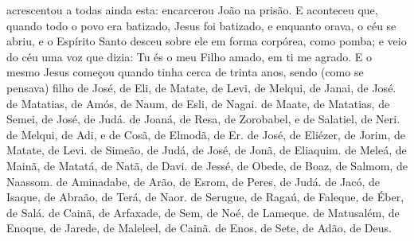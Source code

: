 {  acrescentou a todas ainda esta: encarcerou João na prisão.
  E aconteceu que, quando todo o povo era batizado, Jesus
{} foi batizado, e enquanto orava, o céu se abriu,
  e o Espírito Santo desceu sobre ele em forma corpórea, como pomba; e veio do céu uma voz que dizia: Tu és o meu Filho amado, em ti me agrado.
  E o mesmo Jesus começou quando tinha cerca de trinta anos, sendo (como se pensava) filho de José,
{} de Eli,
   de Matate,
{} de Levi,
{} de Melqui,
{} de Janai,
{} de José.
   de Matatias,
{} de Amós,
{} de Naum,
{} de Esli,
{} de Nagai.
   de Maate,
{} de Matatias,
{} de Semei,
{} de José,
{} de Judá.
   de Joaná,
{} de Resa,
{} de Zorobabel, e
{} de Salatiel,
{} de Neri.
   de Melqui,
{} de Adi, e
{} de Cosã,
{} de Elmodã,
{} de Er.
   de José,{} de Eliézer,
{} de Jorim,
{} de Matate,
{} de Levi.
   de Simeão,
{} de Judá,
{} de José,
{} de Jonã,
{} de Eliaquim.
   de Meleá,
{} de Mainã,
{} de Matatá,
{} de Natã,
{} de Davi.
   de Jessé,
{} de Obede,
{} de Boaz,
{} de Salmom,
{} de Naassom.
   de Aminadabe,
{} de Arão,{} de Esrom,
{} de Peres,
{} de Judá.
   de Jacó,
{} de Isaque,
{} de Abraão,
{} de Terá,
{} de Naor.
   de Serugue,
{} de Ragaú,
{} de Faleque,
{} de Éber,
{} de Salá.
   de Cainã,
{} de Arfaxade,
{} de Sem,
{} de Noé,
{} de Lameque.
   de Matusalém,
{} de Enoque,
{} de Jarede,
{} de Maleleel,
{} de Cainã.
   de Enos,
{} de Sete,
{} de Adão,
{} de Deus.
\par }

